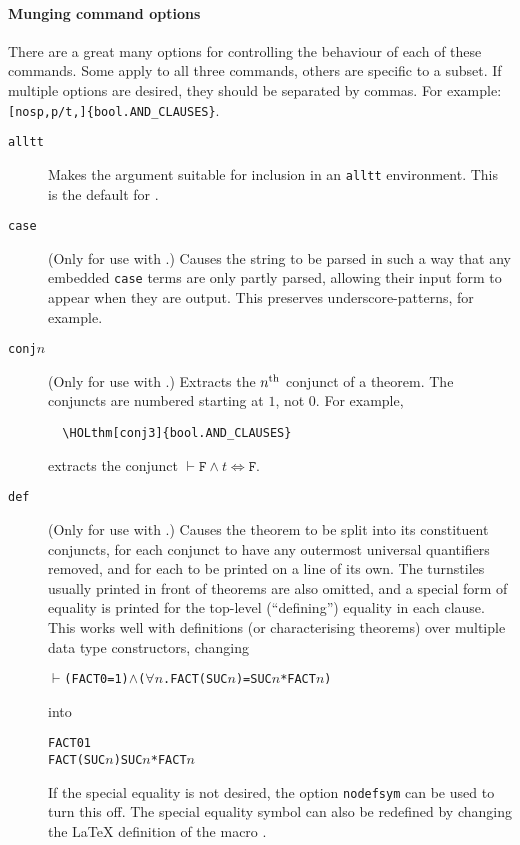 \paragraph{Munging command options}
There are a great many options for controlling the behaviour of each of these commands.
%
Some apply to all three commands, others are specific to a subset.
%
\newcommand{\indentoption}{\gt\gt}
If multiple options are desired, they should be separated by commas. For example: \texttt{\holthm{}[nosp,p/t,\indentoption]\{bool.AND\_CLAUSES\}}.

\begin{description}
\item[\texttt{alltt}] Makes the argument suitable for inclusion in an \texttt{alltt} environment.
%
This is the default for \holthm.
\item[\texttt{case}] (Only for use with \holtm.)
%
Causes the string to be parsed in such a way that any embedded \texttt{case} terms are only partly parsed, allowing their input form to appear when they are output.
%
This preserves underscore-patterns, for example.

\item[\texttt{conj}$n$] (Only for use with \holthm.)
Extracts the $n^{\mbox{\scriptsize th}}$ conjunct of a theorem.
The conjuncts are numbered starting at $1$, not $0$.
For example,
\begin{verbatim}
  \HOLthm[conj3]{bool.AND_CLAUSES}
\end{verbatim}
extracts the conjunct $\vdash \texttt{F} \land t \iff \texttt{F}$.

\item[\texttt{def}] (Only for use with \holthm.)
%
Causes the theorem to be split into its constituent conjuncts, for each conjunct to have any outermost universal quantifiers removed, and for each to be printed on a line of its own.
%
The turnstiles usually printed in front of theorems are also omitted, and a special form of equality is printed for the top-level (``defining'') equality in each clause.
%
This works well with definitions (or characterising theorems) over multiple data type constructors, changing
\begin{alltt}
\(\vdash\) (FACT 0 = 1) \(\land\) (\(\forall\)\ensuremath{n}. FACT (SUC \ensuremath{n}) = SUC \ensuremath{n} * FACT \ensuremath{n})
\end{alltt}
into
\begin{alltt}
   FACT 0 \HOLTokenDefEquality{} 1
   FACT (SUC \ensuremath{n}) \HOLTokenDefEquality{} SUC \ensuremath{n} * FACT \ensuremath{n}
\end{alltt}
If the special equality is not desired, the option \texttt{nodefsym} can be used to turn this off.
The special equality symbol can also be redefined by changing the \LaTeX{} definition of the macro .


\end{description}
